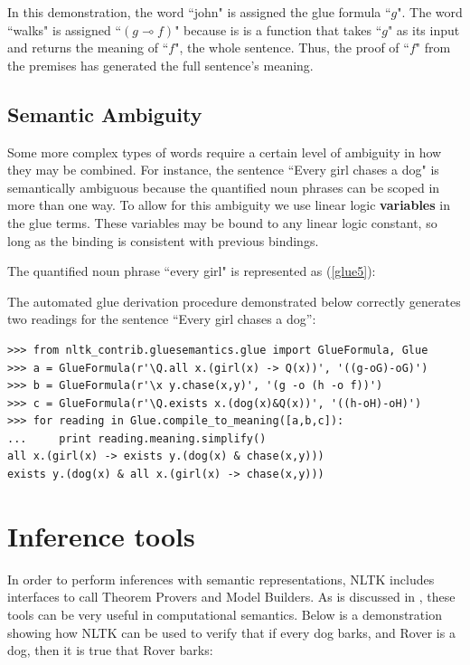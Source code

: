 \documentclass[11pt]{article}
\begin{document}
In this demonstration, the word ``john" is assigned the glue formula ``$g$".  The word ``walks" is assigned ``$(g \multimap f)$" because is is a function that takes ``$g$" as its input and returns the meaning of ``$f$", the whole sentence.  Thus, the proof of ``$f$" from the premises has generated the full sentence's meaning.

\subsection{Semantic Ambiguity}

Some more complex types of words require a certain level of ambiguity in how they may be combined.  For instance, the sentence ``Every girl chases a dog" is semantically ambiguous because the quantified noun phrases can be scoped in more than one way.  To allow for this ambiguity we use linear logic \textbf{variables} in the glue terms.  These variables may be bound to any linear logic constant, so long as the binding is consistent with previous bindings.

The quantified noun phrase ``every girl" is represented as (\ref{glue5}):


The automated glue derivation procedure demonstrated below correctly generates two readings for the sentence ``Every girl chases a dog'':

\begin{verbatim}
>>> from nltk_contrib.gluesemantics.glue import GlueFormula, Glue
>>> a = GlueFormula(r'\Q.all x.(girl(x) -> Q(x))', '((g-oG)-oG)')
>>> b = GlueFormula(r'\x y.chase(x,y)', '(g -o (h -o f))')
>>> c = GlueFormula(r'\Q.exists x.(dog(x)&Q(x))', '((h-oH)-oH)')
>>> for reading in Glue.compile_to_meaning([a,b,c]):
...     print reading.meaning.simplify()
all x.(girl(x) -> exists y.(dog(x) & chase(x,y)))
exists y.(dog(x) & all x.(girl(x) -> chase(x,y)))
\end{verbatim}


\section{Inference tools}
In order to perform inferences with semantic representations, NLTK includes interfaces to call Theorem Provers and Model Builders.  As is discussed in \cite{BB}, these tools can be very useful in computational semantics.  Below is a demonstration showing how NLTK can be used to verify that if every dog barks, and Rover is a dog, then it is true that Rover barks:
\end{document}
